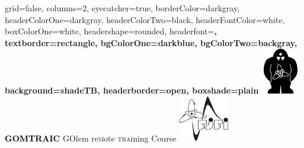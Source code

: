 \documentclass[a4paper,portrait,fontscale=0.65]{baposter}
\begin{document}


\begin{poster}{
	grid=false,
        columns=2,
	eyecatcher=true, 
	borderColor=darkgray,
	headerColorOne=darkgray,
	headerColorTwo=black,
	headerFontColor=white,
	boxColorOne=white,
	headershape=rounded,
	headerfont=\Large\sf\bf,
	textborder=rectangle,
        bgColorOne=darkblue,
        bgColorTwo=backgray,
	background=shadeTB,
	headerborder=open,
  boxshade=plain
}
{
  \includegraphics[height=2cm]{golem}
}
{
\textcolor{black}{\Huge\textbf{\textsc{GOMTRAIC}}}\vspace{0.5em}
}
{
 \textsc{GO}lem re\textsc{m}ote \textsc{trai}ning \textsc{C}ourse
}
{
\includegraphics[height=2cm]{fjfi.png}
}


\end{poster}
\end{document}
